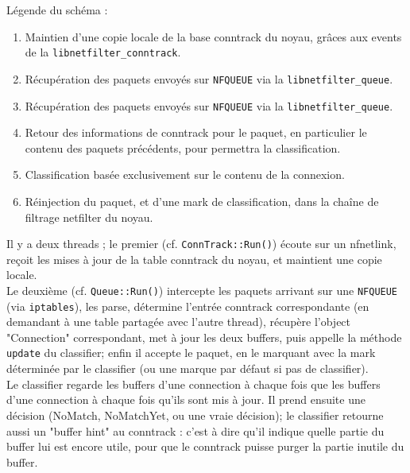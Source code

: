 \begin{footnotesize}
\noindent Légende du schéma :

\begin{enumerate}
\item Maintien d'une copie locale de la base conntrack du noyau, grâces aux \og events \fg{} de la \verb+libnetfilter_conntrack+.
\item Récupération des paquets envoyés sur \verb+NFQUEUE+ via la \verb+libnetfilter_queue+.
\item Récupération des paquets envoyés sur \verb+NFQUEUE+ via la \verb+libnetfilter_queue+.
\item Retour des informations de conntrack pour le paquet, en particulier le contenu des paquets précédents, pour permettra la classification.
\item Classification basée exclusivement sur le contenu de la connexion.
\item Réinjection du paquet, et d'une \og mark \fg{} de classification, dans la chaîne de filtrage netfilter du noyau.
\end{enumerate}
\end{footnotesize}


Il y a deux threads ; le premier (cf. \verb+ConnTrack::Run()+) écoute sur un
nfnetlink, reçoit les mises à jour de la table conntrack du noyau, et
maintient une copie locale.\\

Le deuxième (cf. \verb+Queue::Run()+) intercepte les paquets arrivant sur une
\verb+NFQUEUE+ (via \verb+iptables+), les parse, détermine l'entrée conntrack
correspondante (en demandant à une table partagée avec l'autre
thread), récupère l'object "Connection" correspondant, met à jour les
deux buffers, puis appelle la méthode \verb+update+ du classifier; enfin il
accepte le paquet, en le marquant avec la mark déterminée par le
classifier (ou une marque par défaut si pas de classifier).\\

Le classifier regarde les buffers d'une connection à chaque fois que les buffers d'une connection à chaque fois qu'ils sont mis à jour. Il prend ensuite une décision (NoMatch, NoMatchYet, ou une vraie décision); le classifier retourne aussi un "buffer hint" au conntrack : c'est à dire qu'il indique quelle
partie du buffer lui est encore utile, pour que le conntrack puisse
purger la partie inutile du buffer.\\



